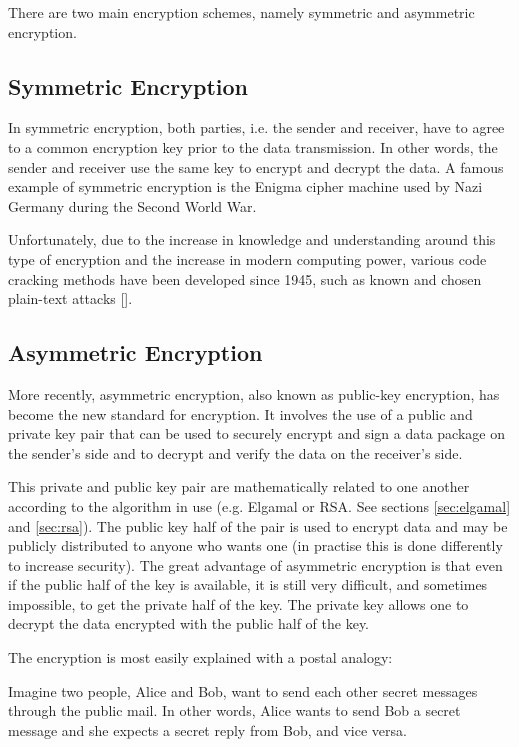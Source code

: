 There are two main encryption schemes, namely symmetric and asymmetric encryption. 

\subsection{Symmetric Encryption}

In symmetric encryption, both parties, i.e. the sender and receiver, have to agree to a common
encryption key prior to the data transmission. In other words, the sender and receiver use the
same key to encrypt and decrypt the data. A famous example of symmetric encryption is the
Enigma cipher machine used by Nazi Germany during the Second World War. 

Unfortunately, due to the increase in knowledge and understanding around this type of
encryption and the increase in modern computing power, various code cracking methods have been
developed since 1945, such as known and chosen plain-text attacks
[\cite{journal:cypher-attacks}]. 

\subsection{Asymmetric Encryption}
\label{sec:assymetric-encryption}

More recently, asymmetric encryption, also known as public-key encryption, has become the new
standard for encryption. It involves the use of a public and private key pair that can be used
to securely encrypt and sign a data package on the sender's side and to decrypt and verify the
data on the receiver's side.

This private and public key pair are mathematically related to one another according to the
algorithm in use (e.g. Elgamal or RSA. See sections \ref{sec:elgamal} and \ref{sec:rsa}). The
public key half of the pair is used to encrypt data and may be publicly distributed to anyone
who wants one (in practise this is done differently to increase security). The
great advantage of asymmetric encryption is that even if the public half of the
key is available, it is still very difficult, and sometimes impossible, to get
the private half of the key. The private key allows one to decrypt the data
encrypted with the public half of the key.

The encryption is most easily explained with a postal analogy:

Imagine two people, Alice and Bob, want to send each other secret messages through the public
mail. In other words, Alice wants to send Bob a secret message and she expects a secret reply
from Bob, and vice versa. 

